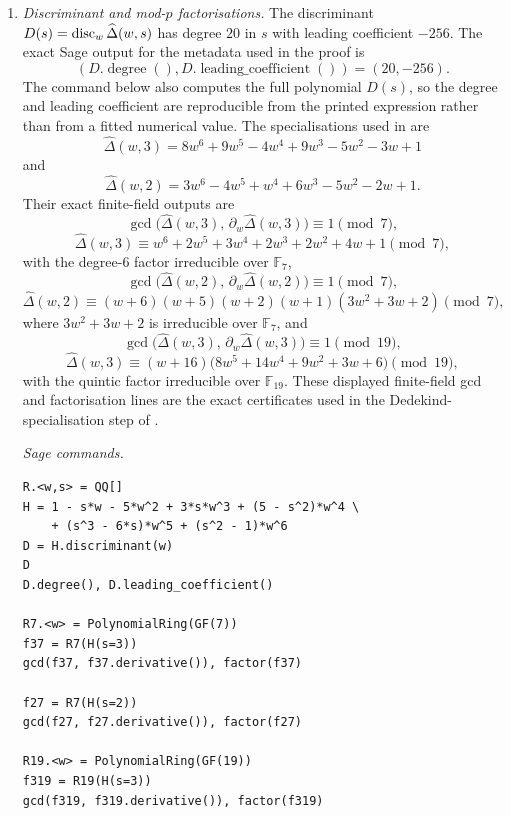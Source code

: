 \begin{enumerate}[label=(\alph*)]
  \item \textit{Discriminant and mod-\(p\) factorisations.}\quad
    The discriminant \(D(s)=\operatorname{disc}_w\widehat\Delta(w,s)\) has degree
    \(20\) in \(s\) with leading coefficient \(-256\). The exact Sage
    output for the metadata used in the proof is
    \[
      (D.\operatorname{degree}(),D.\operatorname{leading\_coefficient}())
      =(20,-256).
    \]
    The command below also computes the full polynomial \(D(s)\), so the
    degree and leading coefficient are reproducible from the printed
    expression rather than from a fitted numerical value. The specialisations
    used in  are
    \[
      \widehat\Delta(w,3)=8w^6+9w^5-4w^4+9w^3-5w^2-3w+1
    \]
    and
    \[
      \widehat\Delta(w,2)=3w^6-4w^5+w^4+6w^3-5w^2-2w+1.
    \]
    Their exact finite-field outputs are
    \[
      \gcd\!\bigl(\widehat\Delta(w,3),\,\partial_w\widehat\Delta(w,3)\bigr)
      \equiv 1 \pmod 7,
    \]
    \[
      \widehat\Delta(w,3)\equiv
      w^6+2w^5+3w^4+2w^3+2w^2+4w+1 \pmod 7,
    \]
    with the degree-\(6\) factor irreducible over \(\mathbb{F}_7\),
    \[
      \gcd\!\bigl(\widehat\Delta(w,2),\,\partial_w\widehat\Delta(w,2)\bigr)
      \equiv 1 \pmod 7,
    \]
    \[
      \widehat\Delta(w,2)\equiv
      (w+6)(w+5)(w+2)(w+1)(3w^2+3w+2)\pmod 7,
    \]
    where \(3w^2+3w+2\) is irreducible over \(\mathbb{F}_7\), and
    \[
      \gcd\!\bigl(\widehat\Delta(w,3),\,\partial_w\widehat\Delta(w,3)\bigr)
      \equiv 1 \pmod{19},
    \]
    \[
      \widehat\Delta(w,3)\equiv
      (w+16)\bigl(8w^5+14w^4+9w^2+3w+6\bigr)\pmod{19},
    \]
    with the quintic factor irreducible over \(\mathbb{F}_{19}\).
    These displayed finite-field gcd and factorisation lines are the
    exact certificates used in the Dedekind-specialisation step of
    .

    \medskip
    \noindent\textit{Sage commands.}
\begin{verbatim}
R.<w,s> = QQ[]
H = 1 - s*w - 5*w^2 + 3*s*w^3 + (5 - s^2)*w^4 \
    + (s^3 - 6*s)*w^5 + (s^2 - 1)*w^6
D = H.discriminant(w)
D
D.degree(), D.leading_coefficient()

R7.<w> = PolynomialRing(GF(7))
f37 = R7(H(s=3))
gcd(f37, f37.derivative()), factor(f37)

f27 = R7(H(s=2))
gcd(f27, f27.derivative()), factor(f27)

R19.<w> = PolynomialRing(GF(19))
f319 = R19(H(s=3))
gcd(f319, f319.derivative()), factor(f319)
\end{verbatim}


\end{enumerate}
